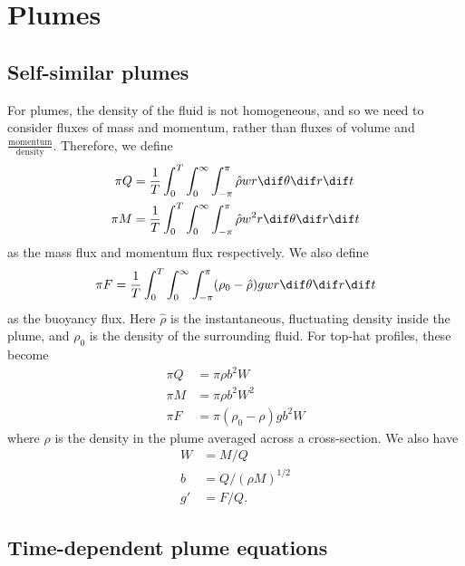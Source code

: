 \section{Plumes}

\subsection{Self-similar plumes}
For plumes, the density of the fluid is not homogeneous, and so we need to consider fluxes of mass and momentum, rather than fluxes of volume and $\displaystyle\frac{\text{momentum}}{\text{density}}$. Therefore, we define
\begin{align}
 \pi Q	&= \frac{1}{T}\int_0^T \int_0^\infty \int_{-\pi}^\pi \hat\rho w r \dif \theta\dif r \dif t \\ 
 \pi M	&= \frac{1}{T}\int_0^T \int_0^\infty \int_{-\pi}^\pi \hat\rho w^2 r \dif \theta\dif r \dif t \\  
\end{align}
as the mass flux and momentum flux respectively. We also define
\begin{equation}
 \pi F		= \frac{1}{T}\int_0^T \int_0^\infty \int_{-\pi}^\pi (\rho_0 - \hat\rho) g w r \dif \theta\dif r \dif t \\ 
\end{equation}
as the buoyancy flux. Here $\hat\rho$ is the instantaneous, fluctuating density inside the plume, and $\rho_0$ is the density of the surrounding fluid. For top-hat profiles, these become
\begin{align}
 \pi Q	&= \pi\rho b^2 W \\
 \pi M	&= \pi\rho b^2 W^2 \\
 \pi F		&= \pi(\rho_0 - \rho) gb^2W
\end{align}
where $\rho$ is the density in the plume averaged across a cross-section. We also have
\begin{align}
 W		&= M/Q \\
 b		&= Q/(\rho M)^{1/2} \\
 g'		&= F/Q.
\end{align}

\subsection{Time-dependent plume equations}

